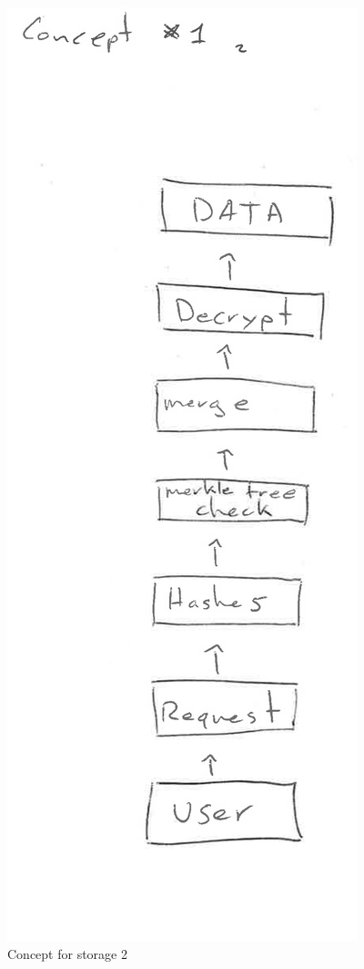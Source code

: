 \begin{figure}[htpb]
\centering
\begin{adjustbox}{center}
\includegraphics[scale=0.9]{annexes/concepts/oc-concept-storage-2.png}
\end{adjustbox}
\caption{Concept for storage 2
\label{fig:oc-concept-storage-2}} 
\end{figure}

